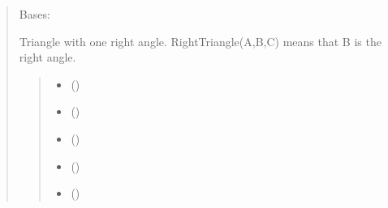 \documentclass[letterpaper,10pt,english]{sphinxmanual}
\begin{document}
\begin{quote}
\begin{fulllineitems}
\label{\detokenize{pygeox:pygeox.custom_objects.RightTriangle}}
\pysigstartsignatures
\pysiglinewithargsret
{}
{\sphinxparamcomma {}\sphinxparamcomma {}\sphinxparamcomma {}\sphinxparamcomma {}\sphinxparamcomma {}}
{}
\pysigstopsignatures
\sphinxAtStartPar
Bases: 

\sphinxAtStartPar
Triangle with one right angle. RightTriangle(A,B,C) means that B is the right angle.
\begin{quote}\begin{description}
\begin{itemize}
\item {} 
\sphinxAtStartPar
{} ()

\item {} 
\sphinxAtStartPar
{} ()

\item {} 
\sphinxAtStartPar
{} ()

\item {} 
\sphinxAtStartPar
{} (\sphinxstyleliteralemphasis{\sphinxupquote{ | }})

\item {} 
\sphinxAtStartPar
{} (\sphinxstyleliteralemphasis{\sphinxupquote{ | }})

\end{itemize}

\end{description}\end{quote}


\end{fulllineitems}
\end{quote}
\end{document}
